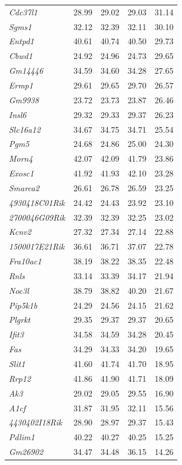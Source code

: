 \documentclass[oneside]{book}\usepackage[]{graphicx}\usepackage[]{color}
\begin{document}
\begin{appendices}
\begin{table}[ht]
\begin{tabular}{>{\em}lrrrr}
  Cdc37l1 & 28.99 & 29.02 & 29.03 & 31.14 \\
  Sgms1 & 32.12 & 32.39 & 32.11 & 30.10 \\
  Entpd1 & 40.61 & 40.74 & 40.50 & 29.73 \\
  Cbwd1 & 24.92 & 24.96 & 24.73 & 29.65 \\
  Gm14446 & 34.59 & 34.60 & 34.28 & 27.65 \\
  Ermp1 & 29.61 & 29.65 & 29.70 & 26.57 \\
  Gm9938 & 23.72 & 23.73 & 23.87 & 26.46 \\
  Insl6 & 29.32 & 29.33 & 29.37 & 26.23 \\
  Slc16a12 & 34.67 & 34.75 & 34.71 & 25.54 \\
  Pgm5 & 24.68 & 24.86 & 25.00 & 24.30 \\
  Morn4 & 42.07 & 42.09 & 41.79 & 23.86 \\
  Exosc1 & 41.92 & 41.93 & 42.10 & 23.28 \\
  Smarca2 & 26.61 & 26.78 & 26.59 & 23.25 \\
  4930418C01Rik & 24.42 & 24.43 & 23.92 & 23.10 \\
  2700046G09Rik & 32.39 & 32.39 & 32.25 & 23.02 \\
  Kcnv2 & 27.32 & 27.34 & 27.14 & 22.88 \\
  1500017E21Rik & 36.61 & 36.71 & 37.07 & 22.78 \\
  Fra10ac1 & 38.19 & 38.22 & 38.35 & 22.48 \\
  Rnls & 33.14 & 33.39 & 34.17 & 21.94 \\
  Noc3l & 38.79 & 38.82 & 40.20 & 21.67 \\
  Pip5k1b & 24.29 & 24.56 & 24.15 & 21.62 \\
  Plgrkt & 29.35 & 29.37 & 29.37 & 20.65 \\
  Ifit3 & 34.58 & 34.59 & 34.28 & 20.45 \\
  Fas & 34.29 & 34.33 & 34.20 & 19.65 \\
  Slit1 & 41.60 & 41.74 & 41.70 & 18.95 \\
  Rrp12 & 41.86 & 41.90 & 41.71 & 18.09 \\
  Ak3 & 29.02 & 29.05 & 29.55 & 16.90 \\
  A1cf & 31.87 & 31.95 & 32.11 & 15.56 \\
  4430402I18Rik & 28.90 & 28.97 & 29.37 & 15.43 \\
  Pdlim1 & 40.22 & 40.27 & 40.25 & 15.25 \\
  Gm26902 & 34.47 & 34.48 & 36.15 & 14.26 \\

\end{tabular}
\end{table}
\end{appendices}
\end{document}
